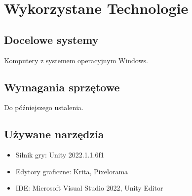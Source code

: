 \documentclass[a4paper]{scrreprt}
\begin{document}


\chapter{Wykorzystane Technologie}

\section{Docelowe systemy}
Komputery z systemem operacyjnym Windows.

\section{Wymagania sprzętowe}
Do późniejszego ustalenia.

\section{Używane narzędzia}
\begin{itemize}
  \item Silnik gry: Unity 2022.1.1.6f1
  \item Edytory graficzne: Krita, Pixelorama
  \item IDE: Microsoft Visual Studio 2022, Unity Editor
\end{itemize}





\end{document}
